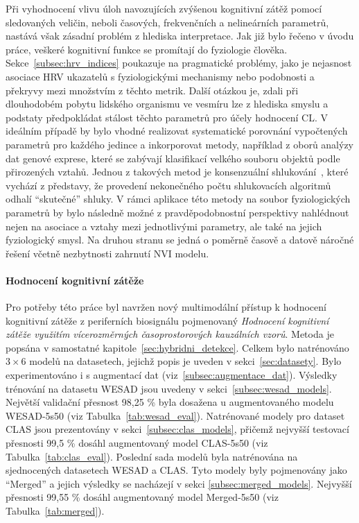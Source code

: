 Při vyhodnocení vlivu úloh navozujících zvýšenou kognitivní zátěž pomocí
sledovaných veličin, neboli časových, frekvenčních a nelineárních parametrů,
nastává však zásadní problém z hlediska interpretace. Jak již bylo řečeno v
úvodu práce, veškeré kognitivní funkce se promítají do fyziologie člověka.
Sekce~\ref{subsec:hrv_indices} poukazuje na pragmatické problémy, jako je
nejasnost asociace HRV ukazatelů s fyziologickými mechanismy nebo podobnosti a
překryvy mezi množstvím z těchto metrik. Další otázkou je, zdali při dlouhodobém
pobytu lidského organismu ve vesmíru lze z hlediska smyslu a podstaty
předpokládat stálost těchto parametrů pro účely hodnocení \gls{CL}. V ideálním
případě by bylo vhodné realizovat systematické porovnání vypočtených parametrů
pro každého jedince a inkorporovat metody, například z oborů analýzy dat genové
exprese, které se zabývají klasifikací velkého souboru objektů podle přirozených
vztahů. Jednou z takových metod je konsenzuální shlukování~\cite{Monti2003},
které vychází z představy, že provedení nekonečného počtu shlukovacích algoritmů
odhalí \enquote{skutečné} shluky. V rámci aplikace této metody na soubor
fyziologických parametrů by bylo následně možné z pravděpodobnostní perspektivy
nahlédnout nejen na asociace a vztahy mezi jednotlivými parametry, ale také na
jejich fyziologický smysl. Na druhou stranu se jedná o poměrně časově a datově
náročné řešení včetně nezbytnosti zahrnutí \gls{NVI} modelu.

\paragraph{Hodnocení kognitivní zátěže}
Pro potřeby této práce byl navržen nový multimodální přístup k hodnocení
kognitivní zátěže z periferních biosignálu pojmenovaný \textit{Hodnocení
kognitivní zátěže využitím vícerozměrných časoprostorových kauzálních vzorů}.
Metoda je popsána v samostatné kapitole~\ref{sec:hybridni_detekce}. Celkem bylo
natrénováno $3 \times 6$ modelů na datasetech, jejichž popis je uveden v
sekci~\ref{sec:datasety}. Bylo experimentováno i s augmentací dat
(viz~\ref{subsec:augmentace_dat}). Výsledky trénování na datasetu WESAD jsou
uvedeny v sekci~\ref{subsec:wesad_models}. Největší validační přesnost 98,25 \%
byla dosažena u augmentovaného modelu WESAD-5s50 (viz
Tabulka~\ref{tab:wesad_eval}). Natrénované modely pro dataset CLAS jsou
prezentovány v sekci~\ref{subsec:clas_models}, přičemž nejvyšší testovací
přesnosti 99,5 \% dosáhl augmentovaný model CLAS-5s50 (viz
Tabulka~\ref{tab:clas_eval}). Poslední sada modelů byla natrénována na
sjednocených datasetech WESAD a CLAS. Tyto modely byly pojmenovány jako
\enquote{Merged} a jejich výsledky se nacházejí v sekci
\ref{subsec:merged_models}. Nejvyšší přesnosti 99,55 \% dosáhl augmentovaný
model Merged-5s50 (viz Tabulka~\ref{tab:merged}). 

